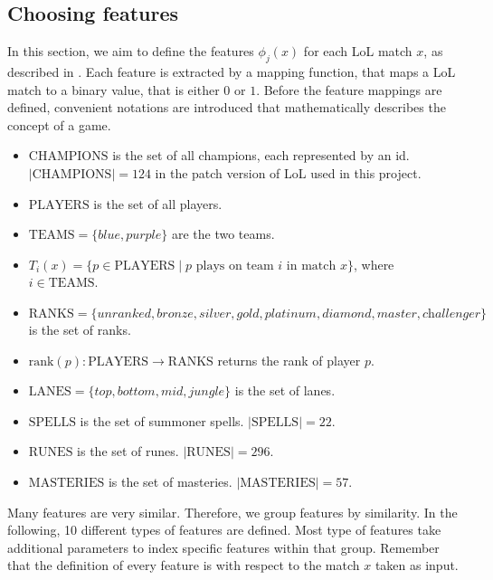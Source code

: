 \subsection{Choosing features}\label{sec:choosingfeatures}
In this section, we aim to define the features $\phi_j(x)$ for each LoL match $x$, as described in .
Each feature is extracted by a mapping function, that maps a LoL match to a binary value, that is either $0$ or $1$.
Before the feature mappings are defined, convenient notations are introduced that mathematically describes the concept of a game.
\begin{itemize}

\item $\text{CHAMPIONS}$ is the set of all champions, each represented by an id. $|\text{CHAMPIONS}| = 124$ in the patch version of LoL used in this project.
\item $\text{PLAYERS}$ is the set of all players.
\item $\text{TEAMS} = \{\textit{blue}, \textit{purple}\}$ are the two teams.
\item $T_i(x) = \{ p \in \text{PLAYERS} \mid p \text{ plays on team } i \text{ in match } x \}$, where $i \in \text{TEAMS}$.
\item $\text{RANKS} = \{\textit{unranked},\textit{bronze},\textit{silver},\textit{gold},\textit{platinum},\textit{diamond},\textit{master},\textit{challenger}\}$ is the set of ranks.
\item $\text{rank}(p) : \text{PLAYERS} \rightarrow \text{RANKS}$ returns the rank of player $p$.
\item $\text{LANES} = \{\textit{top},\textit{bottom},\textit{mid},\textit{jungle}\}$ is the set of lanes.
\item $\text{SPELLS}$ is the set of summoner spells. $|\text{SPELLS}| = 22$.
\item $\text{RUNES}$ is the set of runes. $|\text{RUNES}| = 296$.
\item $\text{MASTERIES}$ is the set of masteries. $|\text{MASTERIES}| = 57$.
\end{itemize}

Many features are very similar. Therefore, we group features by similarity.
In the following, 10 different types of features are defined. Most type of features take additional parameters to index specific features within that group.
Remember that the definition of every feature is with respect to the match $x$ taken as input.

